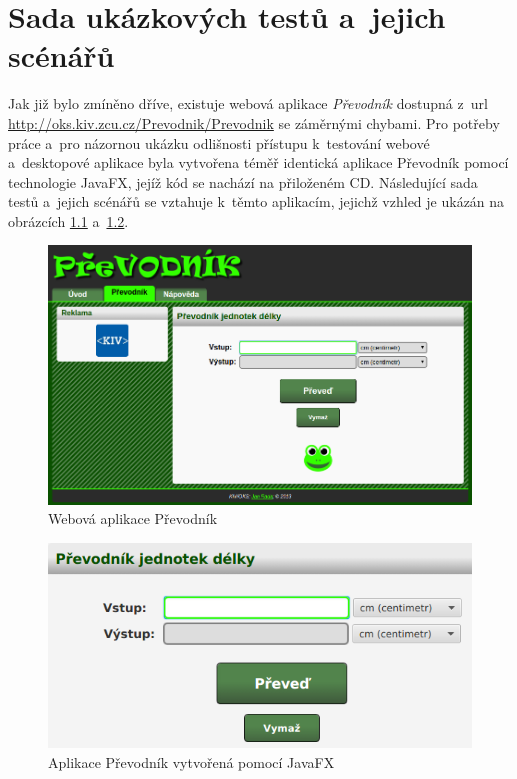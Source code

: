 \chapter{Sada ukázkových testů a~jejich scénářů}
Jak již bylo zmíněno dříve, existuje webová aplikace \emph{Převodník} dostupná z~url \url{http://oks.kiv.zcu.cz/Prevodnik/Prevodnik} se záměrnými chybami. Pro potřeby práce a~pro názornou ukázku odlišnosti přístupu k~testování webové a~desktopové aplikace byla vytvořena téměř identická aplikace Převodník pomocí technologie JavaFX, jejíž kód se nachází na přiloženém CD. Následující sada testů a~jejich scénářů se vztahuje k~těmto aplikacím, jejichž vzhled je ukázán na obrázcích \ref{PrevodnikWeb} a~\ref{PrevodnikJavaFX}.

	\begin{figure}[ht!]
		\centering
		\caption{Webová aplikace Převodník}
		\label{PrevodnikWeb}
		\includegraphics[width=13.5cm]{img/PrevodnikWeb.png}
	\end{figure}
	\begin{figure}[ht!]
		\centering
		\caption{Aplikace Převodník vytvořená pomocí JavaFX}
		\label{PrevodnikJavaFX}
		\includegraphics[width=13.5cm]{img/PrevodnikJavaFX.png}
	\end{figure}

